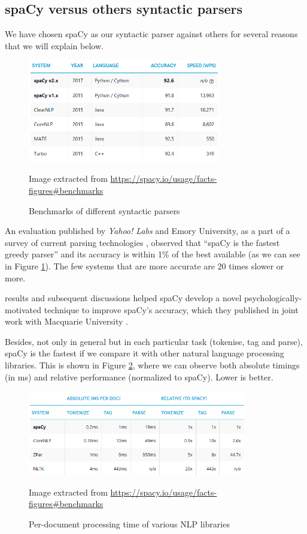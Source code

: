 \subsection{spaCy versus others syntactic parsers}

We have chosen spaCy as our syntactic parser against others for several reasons that we will explain below.

\begin{figure}[h]
	\centering%
	\includegraphics[width = 0.75\textwidth]{Imagenes/Bitmap/spacyeval.png}%
	\caption{Benchmarks of different syntactic parsers}%
	Image extracted from \url{https://spacy.io/usage/facts-figures#benchmarks}
	\label{fig:spacyeval}
\end{figure}

An evaluation published by \textit{Yahoo! Labs} and Emory University, as a part of a survey of current parsing technologies \citep{choi2015depends}, observed that ``spaCy is the fastest greedy parser'' and its accuracy is within 1\% of the best available (as we can see in Figure \ref{fig:spacyeval}). The few systems that are more accurate are 20 times slower or more.

\cite{choi2015depends} results and subsequent discussions helped spaCy develop a novel psychologically-motivated technique to improve spaCy's accuracy, which they published in joint work with Macquarie University \citep{honnibal2015improved}.

Besides, not only in general but in each particular task (tokenise, tag and parse), spaCy is the fastest if we compare it with other natural language processing libraries. This is shown in Figure \ref{fig:spacyspeed}, where we can observe both absolute timings (in ms) and relative performance (normalized to spaCy). Lower is better.

\begin{figure}[h]
	\centering%
	\includegraphics[width = 0.85\textwidth]{Imagenes/Bitmap/spacyspeed.png}%
	\caption{Per-document processing time of various NLP libraries}%
	Image extracted from \url{https://spacy.io/usage/facts-figures#benchmarks}
	\label{fig:spacyspeed}
\end{figure}

